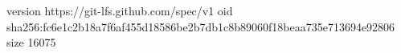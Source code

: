 version https://git-lfs.github.com/spec/v1
oid sha256:fc6e1c2b18a7f6af455d18586be2b7db1c8b89060f18beaa735e713694e92806
size 16075
